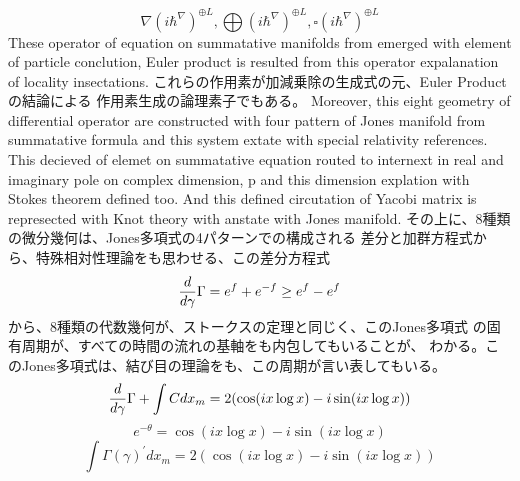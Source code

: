 \documentclass{jsarticle}
\begin{document}
   $$ \nabla ({i \hbar^{\nabla}})^{\oplus L}, \bigoplus ({i \hbar^{\nabla}})^{
	   \oplus L}, \square ({i \hbar^{\nabla}})^{\oplus L} $$
   These operator of equation on summatative manifolds from emerged with
   element of particle conclution, Euler product is resulted from this
   operator expalanation of locality insectations.
   これらの作用素が加減乗除の生成式の元、Euler Productの結論による
   作用素生成の論理素子でもある。
   Moreover, this eight geometry of differential operator are
   constructed with four pattern of Jones manifold from
   summatative formula and this system extate with special relativity
   references. This decieved of elemet on summatative equation routed
   to internext in real and imaginary pole on complex dimension,
p  and this dimension explation with Stokes theorem defined too.
   And this defined circutation of Yacobi matrix is represected with
   Knot theory with anstate with Jones manifold.
   その上に、8種類の微分幾何は、Jones多項式の4パターンでの構成される
   差分と加群方程式から、特殊相対性理論をも思わせる、この差分方程式
   $$ {d \over d \gamma}\Gamma = e^{f} + e^{-f} \ge e^{f} - e^{f} $$
   から、8種類の代数幾何が、ストークスの定理と同じく、このJones多項式
   の固有周期が、すべての時間の流れの基軸をも内包してもいることが、
   わかる。このJones多項式は、結び目の理論をも、この周期が言い表してもいる。
   $$ {d \over d \gamma}\Gamma + \int C dx_m = 2(\cos(i x \log x) - i \sin
   (i x \log x)) $$
    $$ e^{- \theta} = \cos(i x \log x) - i \sin(i x \log x)$$
    $$ \int \Gamma(\gamma)^{'}dx_m = 2(\cos (i x \log x) 
    - i \sin(i x \log x)) $$
\end{document}
